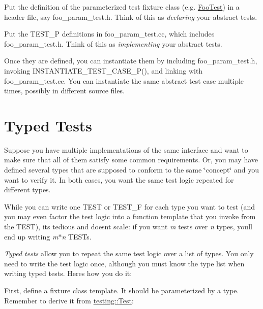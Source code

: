 \begin{DoxyEnumerate}
\item Put the definition of the parameterized test fixture class (e.\+g. {\ttfamily \hyperlink{class_foo_test}{Foo\+Test}}) in a header file, say {\ttfamily foo\+\_\+param\+\_\+test.\+h}. Think of this as {\itshape declaring} your abstract tests.
\end{DoxyEnumerate}
\begin{DoxyEnumerate}
\item Put the {\ttfamily T\+E\+S\+T\+\_\+P} definitions in {\ttfamily foo\+\_\+param\+\_\+test.\+cc}, which includes {\ttfamily foo\+\_\+param\+\_\+test.\+h}. Think of this as {\itshape implementing} your abstract tests.
\end{DoxyEnumerate}

Once they are defined, you can instantiate them by including {\ttfamily foo\+\_\+param\+\_\+test.\+h}, invoking {\ttfamily I\+N\+S\+T\+A\+N\+T\+I\+A\+T\+E\+\_\+\+T\+E\+S\+T\+\_\+\+C\+A\+S\+E\+\_\+\+P()}, and linking with {\ttfamily foo\+\_\+param\+\_\+test.\+cc}. You can instantiate the same abstract test case multiple times, possibly in different source files.

\section*{Typed Tests}

Suppose you have multiple implementations of the same interface and want to make sure that all of them satisfy some common requirements. Or, you may have defined several types that are supposed to conform to the same \char`\"{}concept\char`\"{} and you want to verify it. In both cases, you want the same test logic repeated for different types.

While you can write one {\ttfamily T\+E\+ST} or {\ttfamily T\+E\+S\+T\+\_\+F} for each type you want to test (and you may even factor the test logic into a function template that you invoke from the {\ttfamily T\+E\+ST}), it\textquotesingle{}s tedious and doesn\textquotesingle{}t scale\+: if you want {\itshape m} tests over {\itshape n} types, you\textquotesingle{}ll end up writing {\itshape m$\ast$n} {\ttfamily T\+E\+ST}s.

{\itshape Typed tests} allow you to repeat the same test logic over a list of types. You only need to write the test logic once, although you must know the type list when writing typed tests. Here\textquotesingle{}s how you do it\+:

First, define a fixture class template. It should be parameterized by a type. Remember to derive it from {\ttfamily \hyperlink{classtesting_1_1_test}{testing\+::\+Test}}\+:


